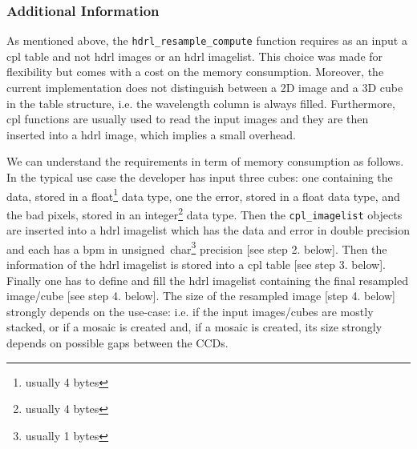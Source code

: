 \subsubsection{Additional Information}

As mentioned above, the \verb+hdrl_resample_compute+ function requires as an
input a cpl table and not hdrl images or an hdrl imagelist. This choice was made
for flexibility but comes with a cost on the memory consumption.  Moreover, the
current implementation does not distinguish between a 2D image and a 3D cube in
the table structure, i.e. the wavelength column is always filled. Furthermore,
cpl functions are usually used to read the input images and they are then
inserted into a hdrl image, which implies a small overhead.

We can understand the requirements in term of memory consumption as follows.
In the typical use case the developer has input three cubes: one containing the data, stored in a float\footnote{usually 4 bytes} data type, one the error, stored in a float data type, and the bad pixels, stored in an integer\footnote{usually 4 bytes} data type.
Then the \verb+cpl_imagelist+ objects are inserted into a hdrl imagelist
which has the data and error in double precision and each has a bpm in
unsigned~char\footnote{usually 1 bytes} precision [see step 2. below].
Then the information of the hdrl imagelist is stored into a cpl table [see
step 3. below].
Finally one has to define and fill the hdrl imagelist containing the
final resampled image/cube [see step 4. below].
The size of the resampled image
[step 4. below] strongly depends on the use-case: i.e. if the input images/cubes
are mostly stacked, or if a mosaic is created and, if a mosaic is created,
its size strongly depends on possible gaps between the CCDs.


